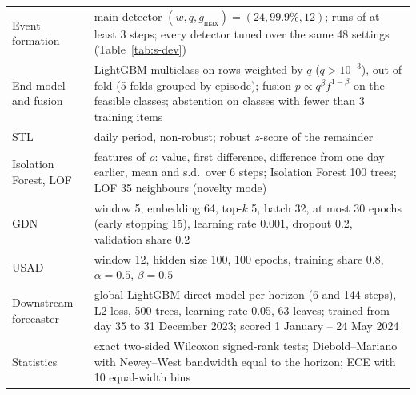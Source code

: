 \documentclass[11pt,a4paper]{article}
\makeatletter
\newenvironment{stable}{\par\addvspace{8pt}\noindent\begin{minipage}{\textwidth}\def\@captype{table}\centering}{\end{minipage}\par\addvspace{8pt}}
\makeatother
\begin{document}
\begin{stable}
\begin{tabular}{@{}>{\raggedright\arraybackslash}p{3.3cm} >{\raggedright\arraybackslash}p{12.2cm}@{}}
Event formation & main detector $(w, q, g_{\max}) = (24, 99.9\%, 12)$; runs of at least 3 steps; every detector tuned over the same 48 settings (Table~\ref{tab:s-dev}) \\
End model and fusion & LightGBM multiclass on rows weighted by $q$ ($q > 10^{-3}$), out of fold (5 folds grouped by episode); fusion $p \propto q^{\beta} f^{1-\beta}$ on the feasible classes; abstention on classes with fewer than 3 training items \\
STL & daily period, non-robust; robust $z$-score of the remainder \\
Isolation Forest, LOF & features of $\rho$: value, first difference, difference from one day earlier, mean and s.d.\ over 6 steps; Isolation Forest 100 trees; LOF 35 neighbours (novelty mode) \\
GDN & window 5, embedding 64, top-$k$ 5, batch 32, at most 30 epochs (early stopping 15), learning rate 0.001, dropout 0.2, validation share 0.2 \\
USAD & window 12, hidden size 100, 100 epochs, training share 0.8, $\alpha = 0.5$, $\beta = 0.5$ \\
Downstream forecaster & global LightGBM direct model per horizon (6 and 144 steps), L2 loss, 500 trees, learning rate 0.05, 63 leaves; trained from day 35 to 31 December 2023; scored 1 January -- 24 May 2024 \\
Statistics & exact two-sided Wilcoxon signed-rank tests; Diebold--Mariano with Newey--West bandwidth equal to the horizon; ECE with 10 equal-width bins \\
\bottomrule
\end{tabular}
\end{stable}
\end{document}
